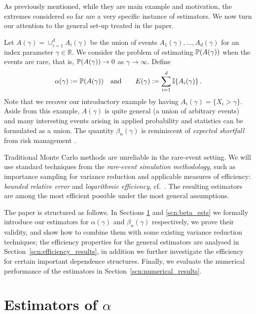 As previously mentioned, while they are main example and motivation, the extremes considered so far are a very specific instance of estimators. We now
turn our attention to the general set-up treated in the paper. 

Let $A(\gamma) = \cup_{i=1}^d A_i(\gamma)$ be the union of events $A_1(\gamma),\dots,A_d(\gamma)$ for an index parameter $\gamma \in \mathbb{R}$. 
    We consider the problem of estimating $\operatorname{{\mathbb P}} ( A(\gamma) ) $ when the events are rare, that is, $\operatorname{{\mathbb P}}(A(\gamma)) \to 0$ as $\gamma \to \infty$.
Define
\[ \alpha(\gamma) := \operatorname{{\mathbb P}} ( A(\gamma) ) \quad \text{and} \quad \quad E(\gamma) := \sum_{i=1}^d \mathbb I\{A_i(\gamma)\} \, .
\]
Note that we recover our introductory example by having 
$A_i(\gamma) = \{X_i > \gamma\}$. Aside from this example, $A(\gamma)$ is quite general (a union of arbitrary events)
and many interesting events arising in applied probability and statistics can be
formulated as a union. The quantity $\beta_n(\gamma)$ is reminiscent of \emph{expected shortfall} from risk management \cite{mcneil2015quantitative}.

Traditional Monte Carlo methods are unreliable in the rare-event setting. We will use standard techniques from the \emph{rare-event simulation methodology}, such as importance sampling for variance reduction and applicable 
measures of efficiency: \emph{bounded relative error} and \emph{logarithmic efficiency}, cf.\ \cite{asmussen2007stochastic,glasserman2003monte,rubinstein2011simulation}. The resulting estimators are among the most efficient possible under the
most general assumptions.

The paper is structured as follows. In Sections \ref{scn:alpha_ests} and \ref{scn:beta_ests} we formally introduce our estimators for $\alpha(\gamma)$ and $\beta_n(\gamma)$ respectively, 
we prove their validity, and
show how to combine them with some existing variance reduction techniques; the efficiency properties
for the general estimators are analysed in Section~\ref{scn:efficiency_results}, in addition we further investigate
the efficiency for certain important dependence structures. Finally, we evaluate the numerical performance of the 
estimators in Section~\ref{scn:numerical_results}. 

\section{Estimators of $\alpha$} \label{scn:alpha_ests}

